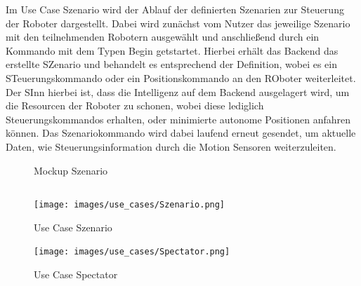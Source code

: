 Im Use Case Szenario wird der Ablauf der definierten Szenarien zur Steuerung der Roboter dargestellt. Dabei wird zunächst vom Nutzer das jeweilige Szenario mit den teilnehmenden Robotern ausgewählt und anschließend durch ein Kommando mit dem Typen Begin getstartet. Hierbei erhält das Backend das erstellte SZenario und behandelt es entsprechend der Definition, wobei es ein STeuerungskommando oder ein Positionskommando an den ROboter weiterleitet.\\
Der SInn hierbei ist, dass die Intelligenz auf dem Backend ausgelagert wird, um die Resourcen der Roboter zu schonen, wobei diese lediglich Steuerungskommandos erhalten, oder minimierte autonome Positionen anfahren können. Das Szenariokommando wird dabei laufend erneut gesendet, um aktuelle Daten, wie Steuerungsinformation durch die Motion Sensoren weiterzuleiten.
 
\begin{figure}[h]
	\centering
	\qquad
	\caption{Mockup Szenario}
\end{figure}
\newpage
\begin{verbatim}
\end{verbatim}
\begin{figure}[h]
	\begin{center}
		\texttt{[image: images/use\_cases/Szenario.png]}
	\end{center}
	\caption{Use Case Szenario}
	\label{fig:UC_Szenario_1}
\end{figure}
\begin{figure}[h]
	\begin{center}
		\texttt{[image: images/use\_cases/Spectator.png]}
	\end{center}
	\caption{Use Case Spectator}
	\label{fig:UC_Szenario_2}
\end{figure}

